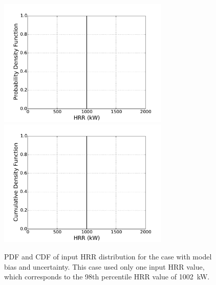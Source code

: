 \documentclass[12pt]{article}
\begin{document}
\clearpage

\begin{figure}[p]
\includegraphics[width=3.2in]{Figures/input_PDF_point}
\includegraphics[width=3.2in]{Figures/input_CDF_point}
\caption{PDF and CDF of input HRR distribution for the case with model bias and uncertainty. This case used only one input HRR value, which corresponds to the 98th percentile HRR value of 1002~kW.}
\label{fig:case_1_input_distributions}
\end{figure}
\end{document}
